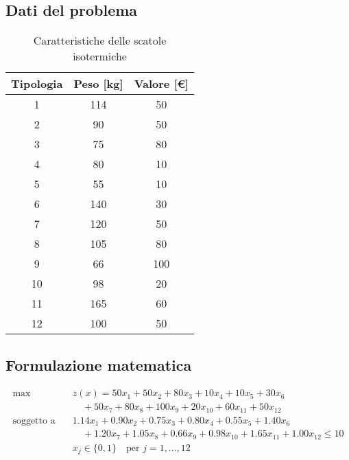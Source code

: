 \subsection{Dati del problema}
\begin{table}[htbp]
    \centering
    \caption{Caratteristiche delle scatole isotermiche}
    \begin{tabular}{|c|c|c|}
        \hline
        \textbf{Tipologia} & \textbf{Peso [kg]} & \textbf{Valore [€]} \\
        \hline
        1 & 114 & 50 \\
        2 & 90 & 50 \\
        3 & 75 & 80 \\
        4 & 80 & 10 \\
        5 & 55 & 10 \\
        6 & 140 & 30 \\
        7 & 120 & 50 \\
        8 & 105 & 80 \\
        9 & 66 & 100 \\
        10 & 98 & 20 \\
        11 & 165 & 60 \\
        12 & 100 & 50 \\
        \hline
    \end{tabular}
\end{table}

\subsection{Formulazione matematica}

\[
\begin{aligned}
\max \quad & z(x) = 50x_1 + 50x_2 + 80x_3 + 10x_4 + 10x_5 + 30x_6 \\
& \quad + 50x_7 + 80x_8 + 100x_9 + 20x_{10} + 60x_{11} + 50x_{12} \\
\text{soggetto a} \quad & 1.14x_1 + 0.90x_2 + 0.75x_3 + 0.80x_4 + 0.55x_5 + 1.40x_6 \\
& \quad + 1.20x_7 + 1.05x_8 + 0.66x_9 + 0.98x_{10} + 1.65x_{11} + 1.00x_{12} \leq 10 \\
& x_j \in \{0, 1\} \quad \text{per } j = 1, \dots, 12
\end{aligned}
\]

